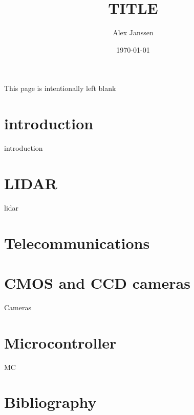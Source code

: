 \documentclass[parskip=full,11pt,a4paper,titlepage]{article}
\title{TITLE}
\author{Alex Janssen}
\date{\today}
\begin{document}



\clearpage

\begin{center}
This page is intentionally left blank
\end{center}
\clearpage



\tableofcontents
\clearpage

\section{introduction}
{introduction}
\clearpage

\section{LIDAR}
{lidar}
\clearpage

\section{Telecommunications}

\section{CMOS and CCD cameras}
{Cameras}
\clearpage

\section{Microcontroller}
{MC}
\clearpage

\section{Bibliography}








\end{document}
